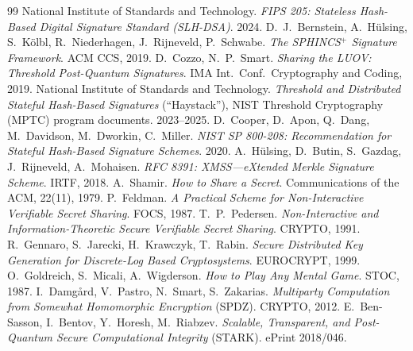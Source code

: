 \documentclass[11pt,a4paper]{article}
\begin{document}
\begin{thebibliography}{99}
 National Institute of Standards and Technology.
\emph{FIPS 205: Stateless Hash-Based Digital Signature Standard (SLH-DSA)}. 2024.
 D.~J.~Bernstein, A.~H\"ulsing, S.~K\"olbl, R.~Niederhagen,
J.~Rijneveld, P.~Schwabe. \emph{The SPHINCS$^+$ Signature Framework}. ACM CCS, 2019.
 D.~Cozzo, N.~P.~Smart. \emph{Sharing the LUOV: Threshold
Post-Quantum Signatures}. IMA Int.\ Conf.\ Cryptography and Coding, 2019.
 National Institute of Standards and Technology. \emph{Threshold
and Distributed Stateful Hash-Based Signatures} (``Haystack''), NIST Threshold
Cryptography (MPTC) program documents. 2023--2025.
 D.~Cooper, D.~Apon, Q.~Dang, M.~Davidson, M.~Dworkin, C.~Miller.
\emph{NIST SP 800-208: Recommendation for Stateful Hash-Based Signature Schemes}.
2020.
 A.~H\"ulsing, D.~Butin, S.~Gazdag, J.~Rijneveld, A.~Mohaisen.
\emph{RFC 8391: XMSS---eXtended Merkle Signature Scheme}. IRTF, 2018.
 A.~Shamir. \emph{How to Share a Secret}. Communications of the ACM,
22(11), 1979.
 P.~Feldman. \emph{A Practical Scheme for Non-Interactive
Verifiable Secret Sharing}. FOCS, 1987.
 T.~P.~Pedersen. \emph{Non-Interactive and Information-Theoretic
Secure Verifiable Secret Sharing}. CRYPTO, 1991.
 R.~Gennaro, S.~Jarecki, H.~Krawczyk, T.~Rabin. \emph{Secure
Distributed Key Generation for Discrete-Log Based Cryptosystems}. EUROCRYPT, 1999.
 O.~Goldreich, S.~Micali, A.~Wigderson. \emph{How to Play Any Mental
Game}. STOC, 1987.
 I.~Damg\aa rd, V.~Pastro, N.~Smart, S.~Zakarias. \emph{Multiparty
Computation from Somewhat Homomorphic Encryption} (SPDZ). CRYPTO, 2012.
 E.~Ben-Sasson, I.~Bentov, Y.~Horesh, M.~Riabzev.
\emph{Scalable, Transparent, and Post-Quantum Secure Computational Integrity}
(STARK). ePrint 2018/046.
\end{thebibliography}
\end{document}

